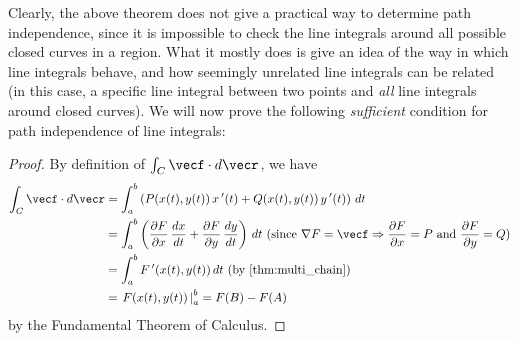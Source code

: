 Clearly, the above theorem does not give a practical way to determine path independence, since it is impossible to check the line integrals around all possible closed curves in a region. What it mostly does is give an idea of the way in which line integrals behave, and how seemingly unrelated line integrals can be related (in this case, a specific line integral between two points and \emph{all} line integrals around closed curves).
%
%
%
We will now prove the following \emph{sufficient} condition for path independence of line integrals:


\begin{proof}
 By definition of $\int_{C}\vecf\cdot d\vecr$, we have
 \begin{align*}
  \int_{C}\vecf\cdot d\vecr
  &= \int_a^b \left( P(x(t),y(t))\,x\,'(t) + Q(x(t),y(t))\,y\,'(t) \right)\,dt\\
  &= \int_a^b \left( \frac{\partial F}{\partial x}\,\frac{dx}{dt} + \frac{\partial F}{\partial y}\,\frac{dy}{dt}
   \right)\,dt \text{ (since $\nabla F = \vecf \Rightarrow \frac{\partial F}{\partial x} = P$ and
  $\frac{\partial F}{\partial y} = Q$)}\\
  &= \int_a^b F\,'(x(t),y(t))\,dt \text{ (by \autoref{thm:multi_chain})}\\
  &= \left.F(x(t),y(t)) \,\right|_a^b = F(B) - F(A)
 \end{align*}
 by the Fundamental Theorem of Calculus.
\end{proof}

